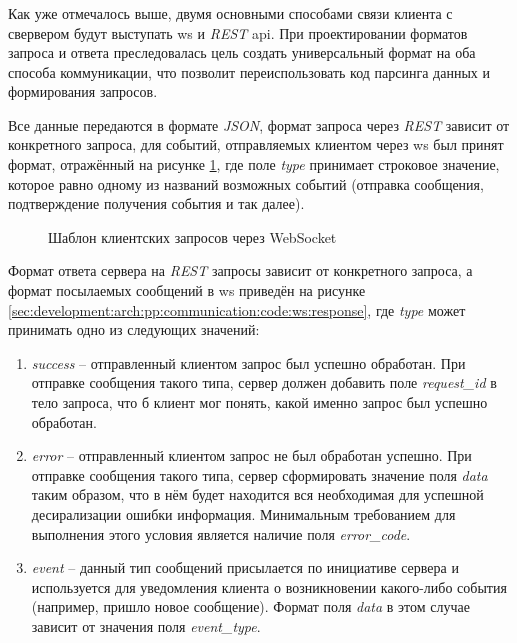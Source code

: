 \subsubsection{}
\label{sec:development:arch:pp:communication}

Как уже отмечалось выше, двумя основными способами связи клиента с свервером будут выступать \gls{ws} и \textit{REST} \gls{api}. При проектировании форматов запроса и ответа преследовалась цель создать универсальный формат на оба способа коммуникации, что позволит переиспользовать код парсинга данных и формирования запросов.

Все данные передаются в формате \textit{JSON}, формат запроса через \textit{REST} зависит от конкретного запроса, для событий, отправляемых клиентом через \gls{ws} был принят формат, отражённый на рисунке \ref{sec:development:arch:pp:communication:code:ws:request}, где поле \textit{type} принимает строковое значение, которое равно одному из названий возможных событий (отправка сообщения, подтверждение получения события и так далее).

\begin{figure}[h]
	
   \caption{Шаблон клиентских запросов через WebSocket}
   \label{sec:development:arch:pp:communication:code:ws:request}
\end{figure}

Формат ответа сервера на \textit{REST} запросы зависит от конкретного запроса, а формат посылаемых сообщений в \gls{ws} приведён на рисунке \ref{sec:development:arch:pp:communication:code:ws:response}, где \textit{type} может принимать одно из следующих значений: 

\begin{enumerate}
	\item \textit{success} -- отправленный клиентом запрос был успешно обработан. При отправке сообщения такого типа, сервер должен добавить поле \textit{request\_id} в тело запроса, что б клиент мог понять, какой именно запрос был успешно обработан.
	\item \textit{error} -- отправленный клиентом запрос не был обработан успешно. При отправке сообщения такого типа, сервер сформировать значение поля \textit{data} таким образом, что в нём будет находится вся необходимая для успешной десирализации ошибки информация. Минимальным требованием для выполнения этого условия является наличие поля \textit{error\_code}.
	\item \textit{event} -- данный тип сообщений присылается по инициативе сервера и используется для уведомления клиента о возникновении какого-либо события (например, пришло новое сообщение). Формат поля \textit{data} в этом случае зависит от значения поля \textit{event\_type}.
\end{enumerate}

